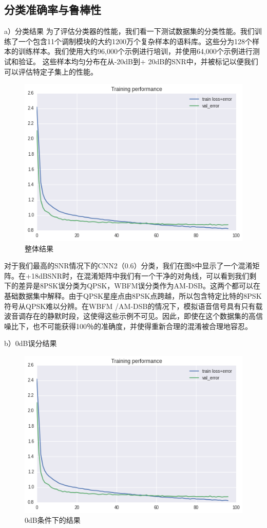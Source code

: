 \subsection{分类准确率与鲁棒性}
a）分类结果
为了评估分类器的性能，我们看一下测试数据集的分类性能。我们训练了一个包含11个调制模块的大约1200万个复杂样本的语料库。这些分为128个样本的训练样本。我们使用大约96,000个示例进行培训，并使用64,000个示例进行测试和验证。 这些样本均匀分布在从-20dB到+ 20dB的SNR中，并被标记以便我们可以评估特定子集上的性能。\par
\begin{figure}[!h]
	\centering
	\includegraphics[scale=0.3]{figures/chapter_3/loss}
	\caption{整体结果}	\label{fig_3_2}
\end{figure}
对于我们最高的SNR情况下的CNN2（0.6）分类，我们在图8中显示了一个混淆矩阵。在+18dBSNR时，在混淆矩阵中我们有一个干净的对角线，可以看到我们剩下的差异是8PSK误分类为QPSK，WBFM误分类作为AM-DSB。这两个都可以在基础数据集中解释。由于QPSK星座点由8PSK点跨越，所以包含特定比特的8PSK符号从QPSK难以分辨。在WBFM /AM-DSB的情况下，模拟语音信号具有只有载波音调存在的静默时段，这使得这些示例不可见。因此，即使在这个数据集的高信噪比下，也不可能获得100％的准确度，并使得重新合理的混淆被合理地容忍。\par

b）0dB误分结果
\begin{figure}[!h]
	\centering
	\includegraphics[scale=0.3]{figures/chapter_3/loss}
	\caption{0dB条件下的结果}	\label{fig_3_2}
\end{figure}

